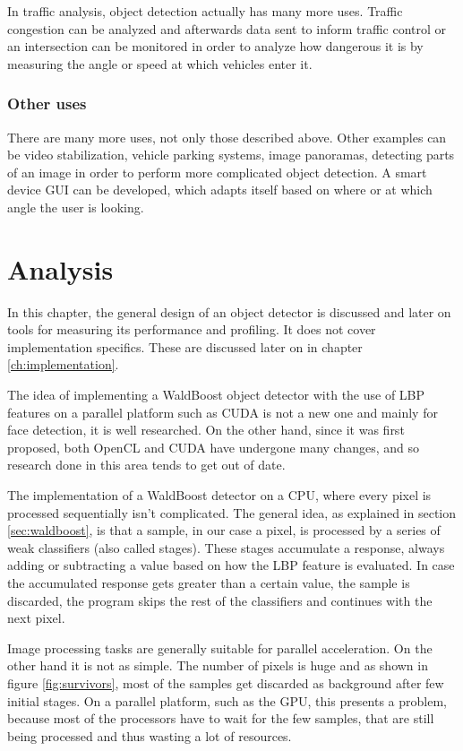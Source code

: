 In traffic analysis, object detection actually has many more uses. Traffic congestion can be analyzed and afterwards data sent to inform traffic control or an intersection can be monitored in order to analyze how dangerous it is by measuring the angle or speed at which vehicles enter it.

\subsection{Other uses}

There are many more uses, not only those described above. Other examples can be video stabilization, vehicle parking systems, image panoramas, detecting parts of an image in order to perform more complicated object detection. A smart device GUI can be developed, which adapts itself based on where or at which angle the user is looking.

\chapter{Analysis}\label{ch:analysis}

In this chapter, the general design of an object detector is discussed and later on tools for measuring its performance and profiling. It does not cover implementation specifics. These are discussed later on in chapter \ref{ch:implementation}.

The idea of implementing a WaldBoost object detector with the use of LBP features on a parallel platform such as CUDA is not a new one and mainly for face detection, it is well researched. On the other hand, since it was first proposed, both OpenCL and CUDA have undergone many changes, and so research done in this area tends to get out of date.

The implementation of a WaldBoost detector on a CPU, where every pixel is processed sequentially isn't complicated. The general idea, as explained in section \ref{sec:waldboost}, is that a sample, in our case a pixel, is processed by a series of weak classifiers (also called stages). These stages accumulate a response, always adding or subtracting a value based on how the LBP feature is evaluated. In case the accumulated response gets greater than a certain value, the sample is discarded, the program skips the rest of the classifiers and continues with the next pixel.

Image processing tasks are generally suitable for parallel acceleration. On the other hand it is not as simple. The number of pixels is huge and as shown in figure \ref{fig:survivors}, most of the samples get discarded as background after few initial stages. On a parallel platform, such as the GPU, this presents a problem, because most of the processors have to wait for the few samples, that are still being processed and thus wasting a lot of resources.

